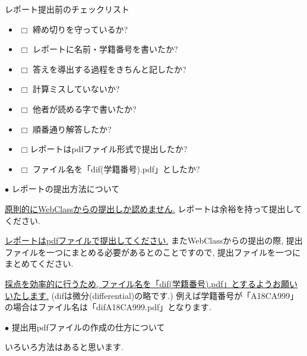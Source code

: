 \documentclass[dvipdfmx,a4paper,11pt]{article}
\theoremstyle{definition}
\begin{document}
 \begin{tcolorbox}[
    colback = white,
    colframe = black,
    fonttitle = \bfseries,
    breakable = true]
    レポート提出前のチェックリスト
    \begin{itemize}
    \item[] $\Box$ 締め切りを守っているか?
    \item[] $\Box$ レポートに名前・学籍番号を書いたか?
     \item[] $\Box$ 答えを導出する過程をきちんと記したか?
     \item[] $\Box$ 計算ミスしていないか?
    \item[] $\Box$ 他者が読める字で書いたか?
    \item[] $\Box$ 順番通り解答したか?
    \item[] $\Box$レポートはpdfファイル形式で提出したか?
   \item[] $\Box$ ファイル名を「dif(学籍番号).pdf」としたか?
    \end{itemize}

  \end{tcolorbox}
  
 
\newpage
 \hspace{-11pt}
{\Large $\bullet$ レポートの提出方法について }
\vspace{11pt}

\underline{原則的にWebClassからの提出しか認めません.}
レポートは余裕を持って提出してください.
\vspace{11pt}

\underline{レポートはpdfファイルで提出してください.}
またWebClassからの提出の際, 提出ファイルを一つにまとめる必要があるとのことですので, 提出ファイルを一つにまとめてください.
\vspace{11pt}

\underline{採点を効率的に行うため, ファイル名を「dif(学籍番号).pdf」とするようお願いいたします.}
(difは微分(differential)の略です.)
例えば学籍番号が「A18CA999」の場合はファイル名は「difA18CA999.pdf」となります.

\vspace{11pt}
 \hspace{-11pt}
{\Large $\bullet$ 提出用pdfファイルの作成の仕方について}
\vspace{11pt}

いろいろ方法はあると思います.
\vspace{11pt}
\end{document}
